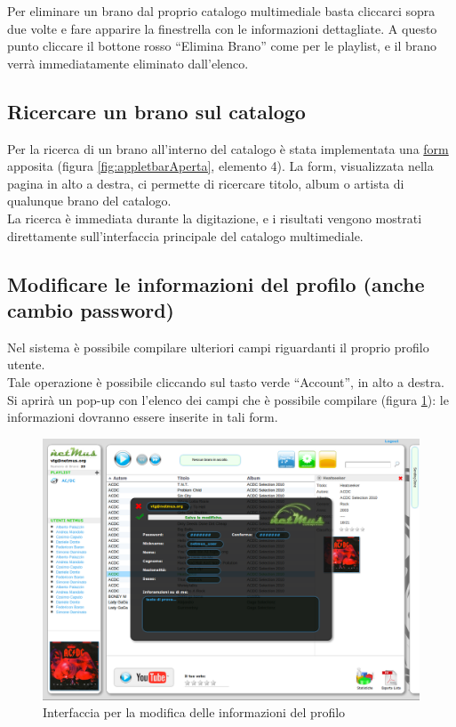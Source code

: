 Per eliminare un brano dal proprio catalogo multimediale basta cliccarci sopra
due volte e fare apparire la finestrella con le informazioni dettagliate. A
questo punto cliccare il bottone rosso ``Elimina Brano'' come per le
playlist, e il brano verr\`a immediatamente eliminato dall'elenco.

\subsection{Ricercare un brano sul catalogo}
\label{cap:ricerca}
Per la ricerca di un brano all'interno del catalogo \`e stata implementata una
\underline{form} apposita (figura \ref{fig:appletbarAperta}, elemento 4). La
form, visualizzata nella pagina in alto a destra, ci permette di ricercare
titolo, album o artista di qualunque brano del catalogo.\\ 
La ricerca \`e immediata durante la digitazione, e i risultati vengono mostrati
direttamente sull'interfaccia principale del catalogo multimediale.

\subsection{Modificare le informazioni del profilo (anche cambio password)}

Nel sistema  \`e possibile compilare ulteriori campi riguardanti il
proprio profilo utente.\\
Tale operazione \`e possibile cliccando sul tasto verde ``Account'', in alto a
destra.
Si aprir\`a un pop-up con l'elenco dei campi che \`e possibile
compilare (figura \ref{fig:profilo}): le informazioni dovranno essere inserite
in tali form.\\
\begin{figure}[!htbp]
  \centering
  \includegraphics[width=14cm]{img/MU/profile_view.png}
\caption{Interfaccia per la modifica delle informazioni del profilo}
\label{fig:profilo}
\end{figure}


